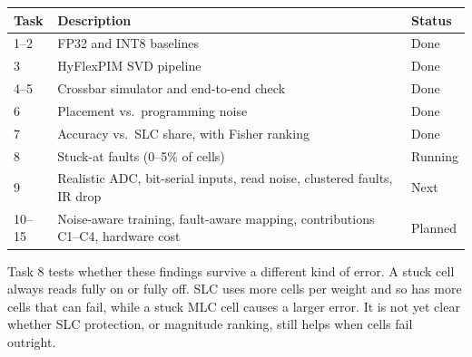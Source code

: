 \documentclass[10pt,a4paper]{article}
\begin{document}
\begin{table}[h]
\centering\small
\begin{tabularx}{\linewidth}{@{}lXl@{}}
\toprule
Task & Description & Status \\
\midrule
1--2  & FP32 and INT8 baselines & Done \\
3     & HyFlexPIM SVD pipeline & Done \\
4--5  & Crossbar simulator and end-to-end check & Done \\
6     & Placement vs.\ programming noise & Done \\
7     & Accuracy vs.\ SLC share, with Fisher ranking & Done \\
8     & Stuck-at faults (0--5\% of cells) & Running \\
9     & Realistic ADC, bit-serial inputs, read noise, clustered faults, IR drop & Next \\
10--15 & Noise-aware training, fault-aware mapping, contributions C1--C4, hardware cost & Planned \\
\bottomrule
\end{tabularx}
\end{table}

Task 8 tests whether these findings survive a different kind of error. A stuck cell always reads fully
on or fully off. SLC uses more cells per weight and so has more cells that can fail, while a stuck MLC
cell causes a larger error. It is not yet clear whether SLC protection, or magnitude ranking, still helps
when cells fail outright.

\vspace{6pt}
\end{document}
